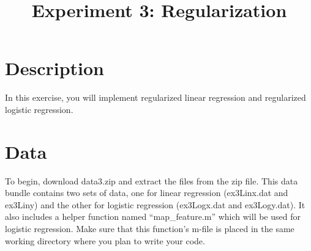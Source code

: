 \documentclass[10pt,a4paper]{article}
\begin{document}
\title{Experiment 3: Regularization}

\maketitle
  
\section{Description}
%
  In this exercise, you will implement regularized linear regression and regularized logistic regression.





\section{Data}
%
  To begin, download data3.zip and extract the files from the zip file. This data bundle contains two sets of data, one for linear regression (ex3Linx.dat and ex3Liny) and the other for logistic regression (ex3Logx.dat and ex3Logy.dat). It also includes a helper function named ``map\_feature.m'' which will be used for logistic regression. Make sure that this function's m-file is placed in the same working directory where you plan to write your code.
\end{document}
